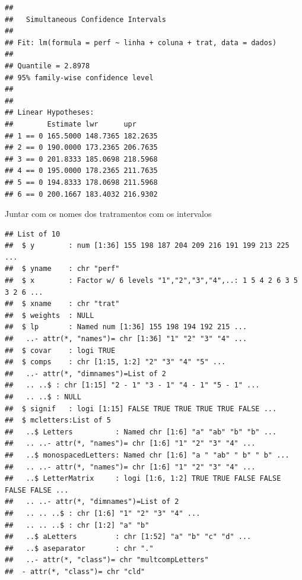 \documentclass[
]{book}
\newenvironment{Shaded}{\begin{snugshade}}{\end{snugshade}}
\newcommand{\KeywordTok}[1]{\textcolor[rgb]{0.13,0.29,0.53}{\textbf{#1}}}
\newcommand{\NormalTok}[1]{#1}
\newcommand{\OperatorTok}[1]{\textcolor[rgb]{0.81,0.36,0.00}{\textbf{#1}}}
\newcommand{\StringTok}[1]{\textcolor[rgb]{0.31,0.60,0.02}{#1}}
\begin{document}
\begin{verbatim}
## 
##   Simultaneous Confidence Intervals
## 
## Fit: lm(formula = perf ~ linha + coluna + trat, data = dados)
## 
## Quantile = 2.8978
## 95% family-wise confidence level
##  
## 
## Linear Hypotheses:
##        Estimate lwr      upr     
## 1 == 0 165.5000 148.7365 182.2635
## 2 == 0 190.0000 173.2365 206.7635
## 3 == 0 201.8333 185.0698 218.5968
## 4 == 0 195.0000 178.2365 211.7635
## 5 == 0 194.8333 178.0698 211.5968
## 6 == 0 200.1667 183.4032 216.9302
\end{verbatim}

Juntar com os nomes dos tratramentos com os intervalos

\begin{Shaded}
\end{Shaded}

\begin{verbatim}
## List of 10
##  $ y        : num [1:36] 155 198 187 204 209 216 191 199 213 225 ...
##  $ yname    : chr "perf"
##  $ x        : Factor w/ 6 levels "1","2","3","4",..: 1 5 4 2 6 3 5 3 2 6 ...
##  $ xname    : chr "trat"
##  $ weights  : NULL
##  $ lp       : Named num [1:36] 155 198 194 192 215 ...
##   ..- attr(*, "names")= chr [1:36] "1" "2" "3" "4" ...
##  $ covar    : logi TRUE
##  $ comps    : chr [1:15, 1:2] "2" "3" "4" "5" ...
##   ..- attr(*, "dimnames")=List of 2
##   .. ..$ : chr [1:15] "2 - 1" "3 - 1" "4 - 1" "5 - 1" ...
##   .. ..$ : NULL
##  $ signif   : logi [1:15] FALSE TRUE TRUE TRUE TRUE FALSE ...
##  $ mcletters:List of 5
##   ..$ Letters          : Named chr [1:6] "a" "ab" "b" "b" ...
##   .. ..- attr(*, "names")= chr [1:6] "1" "2" "3" "4" ...
##   ..$ monospacedLetters: Named chr [1:6] "a " "ab" " b" " b" ...
##   .. ..- attr(*, "names")= chr [1:6] "1" "2" "3" "4" ...
##   ..$ LetterMatrix     : logi [1:6, 1:2] TRUE TRUE FALSE FALSE FALSE FALSE ...
##   .. ..- attr(*, "dimnames")=List of 2
##   .. .. ..$ : chr [1:6] "1" "2" "3" "4" ...
##   .. .. ..$ : chr [1:2] "a" "b"
##   ..$ aLetters         : chr [1:52] "a" "b" "c" "d" ...
##   ..$ aseparator       : chr "."
##   ..- attr(*, "class")= chr "multcompLetters"
##  - attr(*, "class")= chr "cld"
\end{verbatim}
\end{document}
